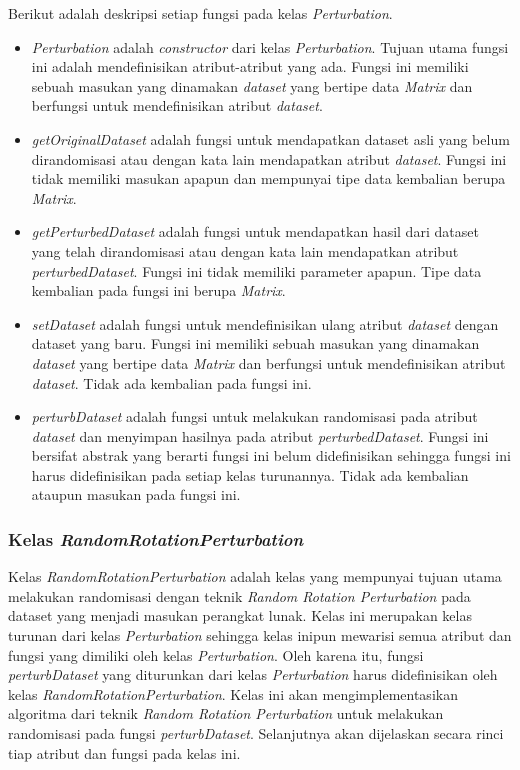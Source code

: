 Berikut adalah deskripsi setiap fungsi pada kelas \textit{Perturbation}.
\begin{itemize}
	\item \textit{Perturbation} adalah \textit{constructor} dari kelas \textit{Perturbation}. Tujuan utama fungsi ini adalah mendefinisikan atribut-atribut yang ada. Fungsi ini memiliki sebuah masukan yang dinamakan \textit{dataset} yang bertipe data \textit{Matrix} dan berfungsi untuk mendefinisikan atribut \textit{dataset}.
	\item \textit{getOriginalDataset} adalah fungsi untuk mendapatkan dataset asli yang belum dirandomisasi atau dengan kata lain mendapatkan atribut \textit{dataset}. Fungsi ini tidak memiliki masukan apapun dan mempunyai tipe data kembalian berupa \textit{Matrix}.
	\item \textit{getPerturbedDataset} adalah fungsi untuk mendapatkan hasil dari dataset yang telah dirandomisasi atau dengan kata lain mendapatkan atribut \textit{perturbedDataset}. Fungsi ini tidak memiliki parameter apapun. Tipe data kembalian pada fungsi ini berupa \textit{Matrix}.
	\item \textit{setDataset} adalah fungsi untuk mendefinisikan ulang atribut \textit{dataset} dengan dataset yang baru. Fungsi ini memiliki sebuah masukan yang dinamakan \textit{dataset} yang bertipe data \textit{Matrix} dan berfungsi untuk mendefinisikan atribut \textit{dataset}. Tidak ada kembalian pada fungsi ini.
	\item \textit{perturbDataset} adalah fungsi untuk melakukan randomisasi pada atribut \textit{dataset} dan menyimpan hasilnya pada atribut \textit{perturbedDataset}. Fungsi ini bersifat abstrak yang berarti fungsi ini belum didefinisikan sehingga fungsi ini harus didefinisikan pada setiap kelas turunannya. Tidak ada kembalian ataupun masukan pada fungsi ini.
\end{itemize}

\subsubsection{Kelas \textit{RandomRotationPerturbation}}
\label{subsubsec:kelas-rrp}

Kelas \textit{RandomRotationPerturbation} adalah kelas yang mempunyai tujuan utama melakukan randomisasi dengan teknik \textit{Random Rotation Perturbation} pada dataset yang menjadi masukan perangkat lunak. Kelas ini merupakan kelas turunan dari kelas \textit{Perturbation} sehingga kelas inipun mewarisi semua atribut dan fungsi yang dimiliki oleh kelas \textit{Perturbation}. Oleh karena itu, fungsi \textit{perturbDataset} yang diturunkan dari kelas \textit{Perturbation} harus didefinisikan oleh kelas \textit{RandomRotationPerturbation}. Kelas ini akan mengimplementasikan algoritma dari teknik \textit{Random Rotation Perturbation} untuk melakukan randomisasi pada fungsi \textit{perturbDataset}. Selanjutnya akan dijelaskan secara rinci tiap atribut dan fungsi pada kelas ini.

